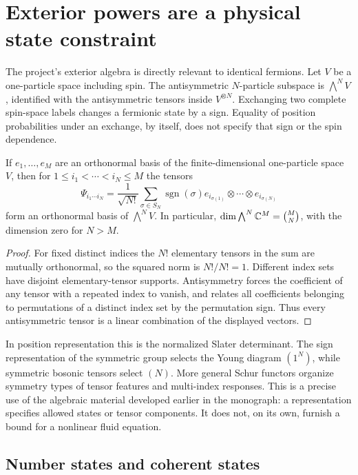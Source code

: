 \section{Exterior powers are a physical state constraint}

The project's exterior algebra is directly relevant to identical
fermions.  Let $V$ be a one-particle space including spin.  The
antisymmetric $N$-particle subspace is $\bigwedge^N V$, identified
with the antisymmetric tensors inside $V^{\otimes N}$.  Exchanging two
complete spin-space labels changes a fermionic state by a sign.  Equality
of position probabilities under an exchange, by itself, does not specify
that sign or the spin dependence.

\begin{proposition}
\label{prop:micro-slater}
If $e_1,\ldots,e_M$ are an orthonormal basis of the finite-dimensional
one-particle space $V$, then for
$1\le i_1<\cdots<i_N\le M$ the tensors
\[
 \Psi_{i_1\cdots i_N}
 =\frac1{\sqrt{N!}}\sum_{\sigma\in S_N}
   \operatorname{sgn}(\sigma)
   e_{i_{\sigma(1)}}\otimes\cdots\otimes e_{i_{\sigma(N)}}
\]
form an orthonormal basis of $\bigwedge^N V$.  In particular,
$\dim\bigwedge^N\mathbb{C}^M=\binom MN$, with the dimension zero for
$N>M$.
\end{proposition}
\begin{proof}
For fixed distinct indices the $N!$ elementary tensors in the sum are
mutually orthonormal, so the squared norm is $N!/N!=1$.  Different
index sets have disjoint elementary-tensor supports.  Antisymmetry forces
the coefficient of any tensor with a repeated index to vanish, and relates
all coefficients belonging to permutations of a distinct index set by
the permutation sign.  Thus every antisymmetric tensor is a linear
combination of the displayed vectors.
\end{proof}

In position representation this is the normalized Slater determinant.
The sign representation of the symmetric group selects the Young diagram
$(1^N)$, while symmetric bosonic tensors select $(N)$.  More general
Schur functors organize symmetry types of tensor features and multi-index
responses.  This is a precise use of the algebraic material developed
earlier in the monograph: a representation specifies allowed states or
tensor components.  It does not, on its own, furnish a bound for a nonlinear
fluid equation.

\subsection{Number states and coherent states}

